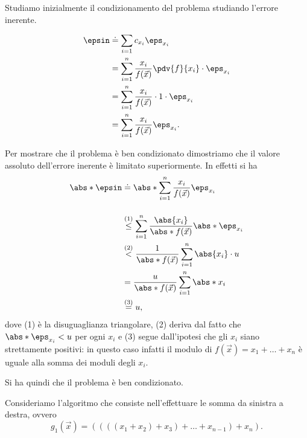  Studiamo inizialmente il condizionamento del problema studiando l'errore inerente.

\begin{align*}
    \epsin &\doteq \sum_{i=1} c_{x_i}\eps_{x_i} \\
    &= \sum_{i=1}^n \frac{x_i}{f(\vec{x})} \pdv{f}{x_i} \cdot \eps_{x_i}\\
    &= \sum_{i=1}^n \frac{x_i}{f(\vec{x})} \cdot 1 \cdot \eps_{x_i}\\
    &= \sum_{i=1}^n \frac{x_i}{f(\vec x)} \eps_{x_i}.
\end{align*}

Per mostrare che il problema è ben condizionato dimostriamo che il valore assoluto dell'errore inerente è limitato superiormente.
In effetti si ha
\begin{align*}
    \abs*{\epsin} &\doteq \abs*{\sum_{i=1}^n \frac{x_i}{f(\vec x)}\eps_{x_i}}\\[1.2em]
    &\stackrel{(1)}{\leq} \sum_{i=1}^n \frac{\abs{x_i}}{\abs*{f(\vec x)}}\abs*{\eps_{x_i}}\\
    &\stackrel{(2)}{<} \frac{1}{\abs*{f(\vec x)}} \sum_{i=1}^n \abs{x_i}\cdot u\\
    &= \frac{u}{\abs*{f(\vec x)}} \sum_{i=1}^n \abs*{x_i} \\
    &\stackrel{(3)}{=} u,
\end{align*} dove (1) è la disuguaglianza triangolare, (2) deriva dal fatto che $\abs*{\eps_{x_i}} < u$ per ogni $x_i$ e (3) segue dall'ipotesi che gli $x_i$ siano strettamente positivi: in questo caso infatti il modulo di $f(\vec x) = x_1 + \dots + x_n$ è uguale alla somma dei moduli degli $x_i$.

Si ha quindi che il problema è ben condizionato.

 Consideriamo l'algoritmo che consiste nell'effettuare le somma da sinistra a destra, ovvero \[
    g_1(\vec x) = ((((x_1 + x_2) + x_3) + \dots + x_{n-1}) + x_n).
\]

